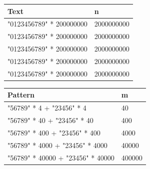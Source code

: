 \documentclass[11pt]{article}
\begin{document}
                \begin{table}[!htb]
                        \begin{minipage}{.5\linewidth}
                            \centering
                                \begin{tabular}{ll}
                                    \textbf{Text} & \textbf{n} \\
                                    \hline
                                    "0123456789" * 200000000 & 2000000000 \\
                                    "0123456789" * 200000000 & 2000000000 \\
                                    "0123456789" * 200000000 & 2000000000 \\
                                    "0123456789" * 200000000 & 2000000000 \\
                                    "0123456789" * 200000000 & 2000000000 \\
                                \end{tabular}
                        \end{minipage}%
                        \begin{minipage}{.5\linewidth}
                            \centering
                                \begin{tabular}{ll}
                                    \textbf{Pattern} & \textbf{m} \\
                                    \hline
                                    "56789" * 4 + "23456" * 4 & 40 \\
                                    "56789" * 40 + "23456" * 40 & 400 \\
                                    "56789" * 400 + "23456" * 400 & 4000 \\
                                    "56789" * 4000 + "23456" * 4000 & 40000 \\
                                    "56789" * 40000 + "23456" * 40000 & 400000 \\
                                \end{tabular}
                        \end{minipage}
                    \label{tab:test_3_1}
                \end{table}
\end{document}
